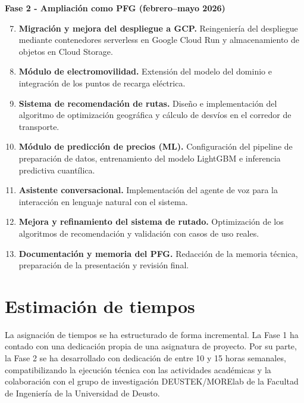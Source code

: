\begin{description}
  \item \textbf{Fase 2 - Ampliación como PFG (febrero--mayo 2026)}
        \begin{enumerate}
          \setcounter{enumi}{6}
          \item \textbf{Migración y mejora del despliegue a GCP.}
                Reingeniería del despliegue mediante contenedores serverless en Google Cloud Run y almacenamiento de objetos en Cloud Storage.
          \item \textbf{Módulo de electromovilidad.}
                Extensión del modelo del dominio e integración de los puntos de recarga eléctrica.
          \item \textbf{Sistema de recomendación de rutas.}
                Diseño e implementación del algoritmo de optimización geográfica y cálculo de desvíos en el corredor de transporte.
          \item \textbf{Módulo de predicción de precios (ML).}
                Configuración del pipeline de preparación de datos, entrenamiento del modelo LightGBM e inferencia predictiva cuantílica.
          \item \textbf{Asistente conversacional.}
                Implementación del agente de voz para la interacción en lenguaje natural
                con el sistema.
          \item \textbf{Mejora y refinamiento del sistema de rutado.}
                Optimización de los algoritmos de recomendación y validación con casos de uso reales.
          \item \textbf{Documentación y memoria del PFG.}
                Redacción de la memoria técnica, preparación de la presentación y revisión final.
        \end{enumerate}

\end{description}

\section{Estimación de tiempos}
La asignación de tiempos se ha estructurado de forma incremental. La Fase 1 ha contado con una dedicación
propia de una asignatura de proyecto. Por su parte, la Fase 2 se ha desarrollado con dedicación 
de entre 10 y 15 horas semanales, compatibilizando la ejecución técnica con las actividades académicas 
y la colaboración con el grupo de investigación DEUSTEK/MORElab \cite{MORElab2026} de la Facultad de Ingeniería de la Universidad de Deusto.

